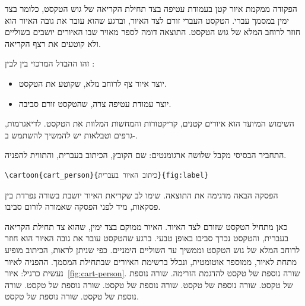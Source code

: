 \documentclass{hebrew-academic-template}
\date{\textenglish{July 2026}}
\begin{document}
\maketitle
\tableofcontents
\listoffigures
\newpage



הפקודה  ממקמת איור קטן בעמודת עטיפה בצד תחילת הקריאה
של גוש הטקסט, כלומר בצד ימין במסמך עברי. הטקסט העברי זורם לצד האיור, וברגע
שהוא עובר את גובה האיור הוא חוזר לרוחב המלא של גוש הטקסט. התוצאה דומה לספר
מאויר שבו האיורים יושבים בשוליים ולא קוטעים את רצף הקריאה.

זהו ההבדל המרכזי בין  לבין :

\begin{itemize}
    \item {} יוצר איור צף לרוחב מלא, שקוטע את הטקסט.
    \item {} יוצר עמודת עטיפה צרה, שהטקסט זורם סביבה.
\end{itemize}

השימוש המיועד הוא איורים קטנים, קריקטורות והמחשות המלוות את הטקסט. לדיאגרמות,
גרפים וטבלאות יש להמשיך להשתמש ב-.



התחביר הבסיסי מקבל שלושה ארגומנטים: שם הקובץ, הכיתוב בעברית, והתווית להפניה.

\begin{english}
\begin{verbatim}
\cartoon{cart_person}{כיתוב האיור בעברית}{fig:label}
\end{verbatim}
\end{english}

הפסקה הבאה מדגימה את התוצאה. שימו לב שקריאת האיור יושבת בשורה נפרדת בין
פסקאות, מיד לפני הפסקה שאמורה לזרום סביבו.

כאן מתחיל הטקסט שזורם לצד האיור. האיור ממוקם בצד ימין, שהוא צד תחילת הקריאה
בעברית, והטקסט נכרך סביבו באופן טבעי. ברגע שהטקסט עובר את גובה האיור הוא
חוזר לרוחב המלא של גוש הטקסט וממשיך עד השוליים הימניים. כפי שניתן לראות,
הכיתוב מופיע מתחת לאיור, ממוספר אוטומטית, ונכלל ברשימת האיורים שבתחילת
המסמך. ההפניה לאיור נעשית כרגיל: איור~\ref{fig:cart-person}. שורה נוספת של
טקסט להדגמת הזרימה. שורה נוספת של טקסט. שורה נוספת של טקסט. שורה נוספת של
טקסט. שורה נוספת של טקסט. שורה נוספת של טקסט. שורה נוספת של טקסט.
\end{document}

